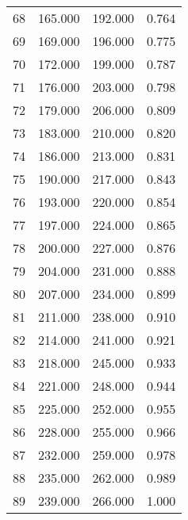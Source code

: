 \begin{tabular}{cccc}
  68 & 165.000 & 192.000 & 0.764 \\ 
  69 & 169.000 & 196.000 & 0.775 \\ 
  70 & 172.000 & 199.000 & 0.787 \\ 
  71 & 176.000 & 203.000 & 0.798 \\ 
  72 & 179.000 & 206.000 & 0.809 \\ 
  73 & 183.000 & 210.000 & 0.820 \\ 
  74 & 186.000 & 213.000 & 0.831 \\ 
  75 & 190.000 & 217.000 & 0.843 \\ 
  76 & 193.000 & 220.000 & 0.854 \\ 
  77 & 197.000 & 224.000 & 0.865 \\ 
  78 & 200.000 & 227.000 & 0.876 \\ 
  79 & 204.000 & 231.000 & 0.888 \\ 
  80 & 207.000 & 234.000 & 0.899 \\ 
  81 & 211.000 & 238.000 & 0.910 \\ 
  82 & 214.000 & 241.000 & 0.921 \\ 
  83 & 218.000 & 245.000 & 0.933 \\ 
  84 & 221.000 & 248.000 & 0.944 \\ 
  85 & 225.000 & 252.000 & 0.955 \\ 
  86 & 228.000 & 255.000 & 0.966 \\ 
  87 & 232.000 & 259.000 & 0.978 \\ 
  88 & 235.000 & 262.000 & 0.989 \\ 
  89 & 239.000 & 266.000 & 1.000 \\ 
   \hline
\end{tabular}
